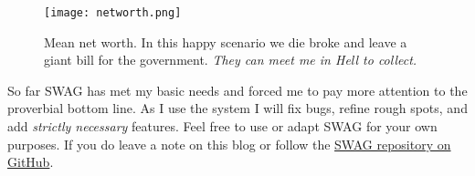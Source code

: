 
\begin{figure}[htbp]
\centering
\texttt{[image: networth.png]}
\caption{Mean net worth. In this happy scenario we die broke and leave a giant bill for
the government. \textit{They can meet me in Hell to collect.}}
\label{fig:5175x2}
\end{figure}


So far SWAG has met my basic needs and forced me to pay more
attention to the proverbial bottom line. As I use the system I will fix
bugs, refine rough spots, and add \emph{strictly necessary} features.
Feel free to use or adapt SWAG for your own purposes. If you do leave a
note on this blog or follow the \href{https://github.com/bakerjd99/jacks/tree/master/swag}{SWAG repository on GitHub}.

%
